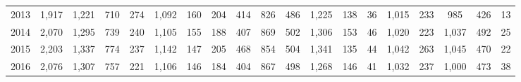 \begin{table}[htbp]
\begin{tabular}{l*{18}{c}}
2013      &    1,917&    1,221&      710&      274&    1,092&      160&      204&      414&      826&      486&    1,225&      138&       36&    1,015&      233&      985&      426&       13\\
2014      &    2,070&    1,295&      739&      240&    1,105&      155&      188&      407&      869&      502&    1,306&      153&       46&    1,020&      223&    1,037&      492&       25\\
2015      &    2,203&    1,337&      774&      237&    1,142&      147&      205&      468&      854&      504&    1,341&      135&       44&    1,042&      263&    1,045&      470&       22\\
2016      &    2,076&    1,307&      757&      221&    1,106&      146&      184&      404&      867&      498&    1,268&      146&       41&    1,032&      237&    1,000&      473&       38\\
\hline\hline
\end{tabular}
\end{table}
